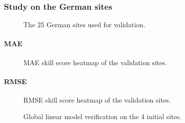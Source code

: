 \subsubsection{Study on the German sites}

\begin{figure}[htb!]
    \centering
    
\caption{The 25 German sites used for validation.}

\end{figure}
\paragraph{MAE}
\begin{figure}[htb!]
    \centering
    
\caption{MAE skill score heatmap of the validation sites.}
\end{figure}
\paragraph{RMSE}
\begin{figure}[htb!]
    \centering
    
\caption{RMSE skill score heatmap of the validation sites.}
\end{figure}


\begin{figure}[htb!]
    \centering
    
\caption{Global linear model verification on the 4 initial sites.}
\end{figure}